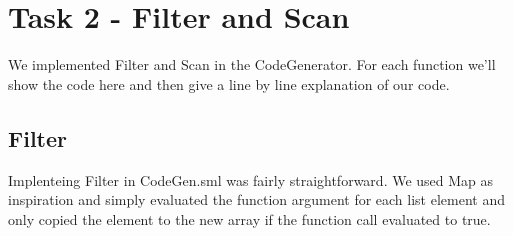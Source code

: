 \documentclass{article}
\begin{document}
\newpage

\section{Task 2 - Filter and Scan}

We implemented Filter and Scan in the CodeGenerator. For each function we'll show the code here and then give a line by line explanation of our code.

\subsection{Filter}
Implenteing Filter in CodeGen.sml was fairly straightforward. We used Map as inspiration and simply evaluated the function argument for each list element and only copied the element to the new array if the function call evaluated to true.\\
\end{document}
